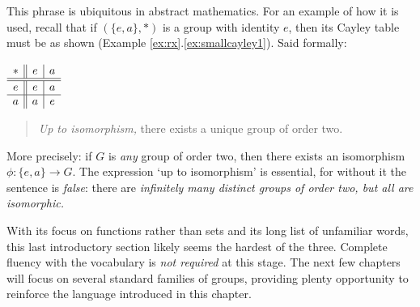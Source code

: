 \bigskip


\begin{minipage}[t]{0.85\linewidth}\vspace{-10pt}
	\label{sec:uptoiso} This phrase is ubiquitous in abstract mathematics. For an example of how it is used, recall that if $(\{e,a\},*)$ is a group with identity $e$, then its Cayley table must be as shown (Example \ref*{ex:rx}.\ref{ex:smallcayley1}). Said formally:
\end{minipage}
\hfill
\begin{minipage}[t]{0.14\linewidth}\vspace{-10pt}
	\flushright%
	$\begin{array}[t]{c||c|c}
		* & e & a\\\hline\hline
		e & e & a\\\hline
		a & a & e
	\end{array}$
\end{minipage}\par

\begin{quote}
	\emph{Up to isomorphism,} there exists a unique group of order two.
\end{quote}

More precisely: if $G$ is \emph{any} group of order two, then there exists an isomorphism $\phi:\{e,a\}\to G$. The expression `up to isomorphism' is essential, for without it the sentence is \emph{false}: there are \emph{infinitely many distinct groups of order two, but all are isomorphic.}

\goodbreak


With its focus on functions rather than sets and its long list of unfamiliar words, this last introductory section likely seems the hardest of the three. Complete fluency with the vocabulary is \emph{not required} at this stage. The next few chapters will focus on several standard families of groups, providing plenty opportunity to reinforce the language introduced in this chapter.


